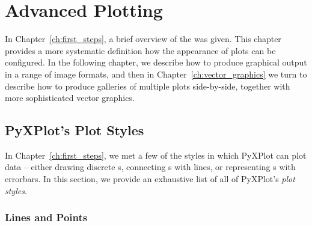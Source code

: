 %
%
%
%
%



\chapter{Advanced Plotting}
\label{ch:plotting}

In Chapter~\ref{ch:first_steps}, a brief overview of the  was
given. This chapter provides a more systematic definition how the appearance of
plots can be configured. In the following chapter, we describe how to produce
graphical output in a range of image formats, and then in
Chapter~\ref{ch:vector_graphics} we turn to describe how to produce galleries
of multiple plots side-by-side, together with more sophisticated vector
graphics.

\section{PyXPlot's Plot Styles}

In Chapter~\ref{ch:first_steps}, we met a few of the styles in which PyXPlot
can plot data -- either drawing discrete \datapoint s, connecting \datapoint s
with lines, or representing \datapoint s with errorbars.  In this section, we
provide an exhaustive list of all of PyXPlot's {\it plot styles}.

\subsection{Lines and Points}

